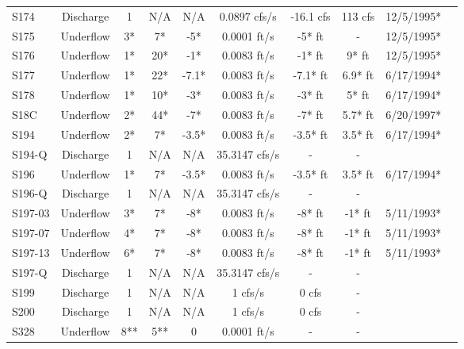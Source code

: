 \begin{table}[h]
\begin{tabular}{@{}lccccccccc@{}}
{S174}          & Discharge     & 1        & N/A         & N/A          & 0.0897 cfs/s   & -16.1 cfs       & 113 cfs & 12/5/1995*      \\
{S175}          & Underflow     & 3*       & 7*          & -5*          & 0.0001 ft/s    & -5* ft          & -       & 12/5/1995*      \\
{S176}          & Underflow     & 1*       & 20*         & -1*          & 0.0083 ft/s    & -1* ft          & 9* ft   & 12/5/1995*      \\
{S177}          & Underflow     & 1*       & 22*         & -7.1*        & 0.0083 ft/s    & -7.1* ft        & 6.9* ft & 6/17/1994*      \\
{S178}          & Underflow     & 1*       & 10*         & -3*          & 0.0083 ft/s    & -3* ft          & 5* ft   & 6/17/1994*      \\
{S18C}          & Underflow     & 2*       & 44*         & -7*          & 0.0083 ft/s    & -7* ft          & 5.7* ft & 6/20/1997*      \\
{S194}          & Underflow     & 2*       & 7*          & -3.5*        & 0.0083 ft/s    & -3.5* ft        & 3.5* ft & 6/17/1994*      \\
{S194-Q}        & Discharge     & 1        & N/A         & N/A          & 35.3147 cfs/s  & -               & -       &                 \\
{S196}          & Underflow     & 1*       & 7*          & -3.5*        & 0.0083 ft/s    & -3.5* ft        & 3.5* ft & 6/17/1994*      \\
{S196-Q}        & Discharge     & 1        & N/A         & N/A          & 35.3147 cfs/s  & -               & -       &                 \\
{S197-03}       & Underflow     & 3*       & 7*          & -8*          & 0.0083 ft/s    & -8* ft          & -1* ft  & 5/11/1993*      \\
{S197-07}       & Underflow     & 4*       & 7*          & -8*          & 0.0083 ft/s    & -8* ft          & -1* ft  & 5/11/1993*      \\
{S197-13}       & Underflow     & 6*       & 7*          & -8*          & 0.0083 ft/s    & -8* ft          & -1* ft  & 5/11/1993*      \\
{S197-Q}        & Discharge     & 1        & N/A         & N/A          & 35.3147 cfs/s  & -               & -       &                 \\
{S199}          & Discharge     & 1        & N/A         & N/A          & 1 cfs/s        & 0 cfs           & -       &                 \\
{S200}          & Discharge     & 1        & N/A         & N/A          & 1 cfs/s        & 0 cfs           & -       &                 \\
{S328}          & Underflow     & 8**      & 5**         & 0            & 0.0001 ft/s    & -               & -       &                 \\
\hline
\end{tabular}


\end{table}
